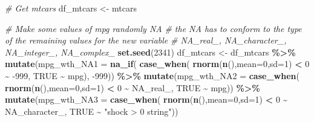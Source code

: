 \documentclass[
]{book}
\newenvironment{Shaded}{\begin{snugshade}}{\end{snugshade}}
\newcommand{\CommentTok}[1]{\textcolor[rgb]{0.56,0.35,0.01}{\textit{#1}}}
\newcommand{\DataTypeTok}[1]{\textcolor[rgb]{0.13,0.29,0.53}{#1}}
\newcommand{\DecValTok}[1]{\textcolor[rgb]{0.00,0.00,0.81}{#1}}
\newcommand{\KeywordTok}[1]{\textcolor[rgb]{0.13,0.29,0.53}{\textbf{#1}}}
\newcommand{\NormalTok}[1]{#1}
\newcommand{\OperatorTok}[1]{\textcolor[rgb]{0.81,0.36,0.00}{\textbf{#1}}}
\newcommand{\OtherTok}[1]{\textcolor[rgb]{0.56,0.35,0.01}{#1}}
\newcommand{\StringTok}[1]{\textcolor[rgb]{0.31,0.60,0.02}{#1}}
\begin{document}
\begin{Shaded}
\begin{Highlighting}[]
\CommentTok{\# Get mtcars}
\NormalTok{df\_mtcars \textless{}{-}}\StringTok{ }\NormalTok{mtcars}

\CommentTok{\# Make some values of mpg randomly NA}
\CommentTok{\# the NA has to conform to the type of the remaining values for the new variable}
\CommentTok{\# NA\_real\_, NA\_character\_, NA\_integer\_, NA\_complex\_}
\KeywordTok{set.seed}\NormalTok{(}\DecValTok{2341}\NormalTok{)}
\NormalTok{df\_mtcars \textless{}{-}}\StringTok{ }\NormalTok{df\_mtcars }\OperatorTok{\%\textgreater{}\%}\StringTok{ }
\StringTok{  }\KeywordTok{mutate}\NormalTok{(}\DataTypeTok{mpg\_wth\_NA1 =} \KeywordTok{na\_if}\NormalTok{(}
    \KeywordTok{case\_when}\NormalTok{(}
      \KeywordTok{rnorm}\NormalTok{(}\KeywordTok{n}\NormalTok{(),}\DataTypeTok{mean=}\DecValTok{0}\NormalTok{,}\DataTypeTok{sd=}\DecValTok{1}\NormalTok{) }\OperatorTok{\textless{}}\StringTok{ }\DecValTok{0} \OperatorTok{\textasciitilde{}}\StringTok{ }\DecValTok{{-}999}\NormalTok{, }
      \OtherTok{TRUE} \OperatorTok{\textasciitilde{}}\StringTok{ }\NormalTok{mpg), }
    \DecValTok{{-}999}\NormalTok{)) }\OperatorTok{\%\textgreater{}\%}
\StringTok{  }\KeywordTok{mutate}\NormalTok{(}\DataTypeTok{mpg\_wth\_NA2 =} \KeywordTok{case\_when}\NormalTok{(}
    \KeywordTok{rnorm}\NormalTok{(}\KeywordTok{n}\NormalTok{(),}\DataTypeTok{mean=}\DecValTok{0}\NormalTok{,}\DataTypeTok{sd=}\DecValTok{1}\NormalTok{) }\OperatorTok{\textless{}}\StringTok{ }\DecValTok{0} \OperatorTok{\textasciitilde{}}\StringTok{ }\OtherTok{NA\_real\_}\NormalTok{, }
    \OtherTok{TRUE} \OperatorTok{\textasciitilde{}}\StringTok{ }\NormalTok{mpg)) }\OperatorTok{\%\textgreater{}\%}
\StringTok{  }\KeywordTok{mutate}\NormalTok{(}\DataTypeTok{mpg\_wth\_NA3 =} \KeywordTok{case\_when}\NormalTok{(}
    \KeywordTok{rnorm}\NormalTok{(}\KeywordTok{n}\NormalTok{(),}\DataTypeTok{mean=}\DecValTok{0}\NormalTok{,}\DataTypeTok{sd=}\DecValTok{1}\NormalTok{) }\OperatorTok{\textless{}}\StringTok{ }\DecValTok{0} \OperatorTok{\textasciitilde{}}\StringTok{ }\OtherTok{NA\_character\_}\NormalTok{, }
    \OtherTok{TRUE} \OperatorTok{\textasciitilde{}}\StringTok{ "shock \textgreater{} 0 string"}\NormalTok{))}
  

\end{Highlighting}
\end{Shaded}
\end{document}
